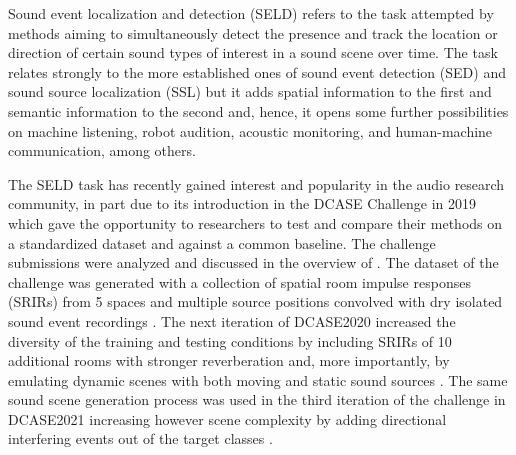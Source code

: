 \documentclass{article}
\begin{document}
\begin{sloppy}
Sound event localization and detection (SELD) refers to the task attempted by methods aiming to simultaneously detect the presence and track the location or direction of certain sound types of interest in a sound scene over time. The task relates strongly to the more established ones of sound event detection (SED) and sound source localization (SSL) but it adds spatial information to the first and semantic information to the second and, hence, it opens some further possibilities on machine listening, robot audition, acoustic monitoring, and human-machine communication, among others.

The SELD task has recently gained interest and popularity in the audio research community, in part due to its introduction in the DCASE Challenge in 2019 which gave the opportunity to researchers to test and compare their methods on a standardized dataset and against a common baseline. The challenge submissions were analyzed and discussed in the overview of \cite{politis2020overview}. The dataset of the challenge was generated with a collection of spatial room impulse responses (SRIRs) from 5 spaces and multiple source positions convolved with dry isolated sound event recordings \cite{Adavanne2019a}. The next iteration of DCASE2020 increased the diversity of the training and testing conditions by including SRIRs of 10 additional rooms with stronger reverberation and, more importantly, by emulating dynamic scenes with both moving and static sound sources \cite{Politis2020}. The same sound scene generation process was used in the third iteration of the challenge in DCASE2021 increasing however scene complexity by adding directional interfering events out of the target classes \cite{Politis2021}.


\end{sloppy}
\end{document}
